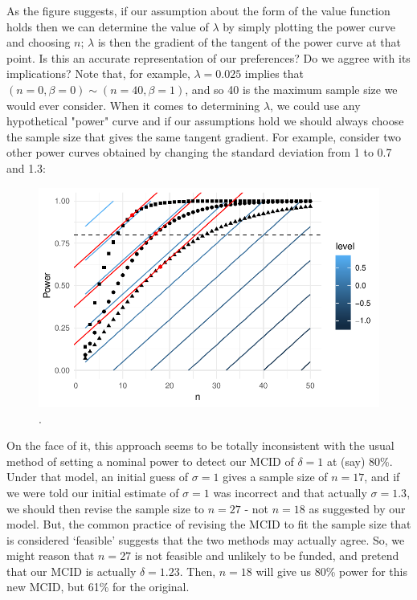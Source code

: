 \documentclass[sagev]{sagej}
\begin{document}
As the figure suggests, if our assumption about the form of the value function holds then we can determine the value of $\lambda$ by simply plotting the power curve and choosing $n$; $\lambda$ is then the gradient of the tangent of the power curve at that point. Is this an accurate representation of our preferences? Do we aggree with its implications? Note that, for example, $\lambda = 0.025$ implies that $(n=0, \beta=0) \sim (n=40, \beta=1)$, and so 40 is the maximum sample size we would ever consider. When it comes to determining $\lambda$, we could use any hypothetical "power" curve and if our assumptions hold we should always choose the sample size that gives the same tangent gradient. For example, consider two other power curves obtained by changing the standard deviation from 1 to 0.7 and 1.3:

\begin{figure}
\centering
\includegraphics[scale=0.8]{./figures/ex1_3tangents}
\caption{.}
\label{fig:ex1_3tangents}
\end{figure}

On the face of it, this approach seems to be totally inconsistent with the usual method of setting a nominal power to detect our MCID of $\delta = 1$ at (say) 80\%. Under that model, an initial guess of $\sigma = 1$ gives a sample size of $n = 17$, and if we were told our initial estimate of $\sigma = 1$ was incorrect and that actually $\sigma = 1.3$, we should then revise the sample size to $n = 27$ - not $n = 18$ as suggested by our model. But, the common practice of revising the MCID to fit the sample size that is considered `feasible' suggests that the two methods may actually agree. So, we might reason that $n = 27$ is not feasible and unlikely to be funded, and pretend that our MCID is actually $\delta = 1.23$. Then, $n = 18$ will give us 80\% power for this new MCID, but 61\% for the original.
\end{document}
